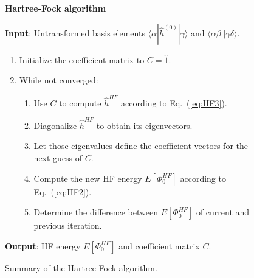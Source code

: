 \begin{figure}
\begin{framed}
\begin{center}
\textbf{Hartree-Fock algorithm}
\end{center}
\textbf{Input}: Untransformed basis elements $\langle \alpha |\hat{h}^{(0)}| \gamma\rangle$ and $\langle \alpha \beta ||\gamma\delta\rangle$.

\begin{enumerate}
\item Initialize the coefficient matrix to $C=\hat{1}$.
\item While not converged:
\begin{enumerate}
\item Use $C$ to compute $\hat{h}^{HF}$ according to Eq.~(\ref{eq:HF3}).
\item Diagonalize $\hat{h}^{HF}$ to obtain its eigenvectors.
\item Let those eigenvalues define the coefficient vectors for the next guess of $C$.
\item Compute the new HF energy $E \left[ \Phi_0^{HF}\right]$ according to Eq.~(\ref{eq:HF2}).
\item Determine the difference between $E \left[ \Phi_0^{HF}\right]$ of current and previous iteration.
\end{enumerate}
\end{enumerate}
\textbf{Output}: HF energy $E \left[ \Phi_0^{HF}\right]$ and coefficient matrix $C$.
\end{framed}
\caption{Summary of the Hartree-Fock algorithm.}
\label{fig:HFbox}
\end{figure}

